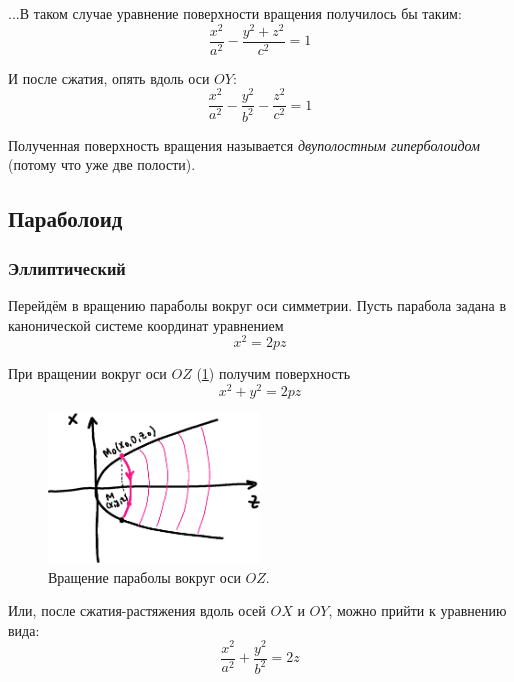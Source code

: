 \documentclass[a4paper,12pt]{article}
\begin{document}
  ...В таком случае уравнение поверхности вращения получилось бы таким:
  \[
    \frac{x^2}{a^2} - \frac{y^2 + z^2}{c^2} = 1
  \]
  
  И после сжатия, опять вдоль оси $OY$:
  \begin{equation}
    \label{eq:hyperboloid2}
    \boxed{
      \frac{x^2}{a^2} - \frac{y^2}{b^2} - \frac{z^2}{c^2} = 1
    }
  \end{equation}
  
  Полученная поверхность вращения называется \emph{двуполостным гиперболоидом} (потому что уже две полости).
  
  
  \subsection{Параболоид}
  
  \subsubsection{Эллиптический}
  
  Перейдём в вращению параболы вокруг оси симметрии.
  Пусть парабола задана в канонической системе координат уравнением
  \[
    x^2 = 2pz
  \]
  
  При вращении вокруг оси $OZ$ (\ref{fig:parabola-rotate-1}) получим поверхность
  \[
    x^2 + y^2 = 2pz
  \]
  
  \begin{figure}[h]
    \centering

    \includegraphics[width=0.5\textwidth]{parabola-rotate-1}
  
    \caption{Вращение параболы вокруг оси $OZ$.}
    \label{fig:parabola-rotate-1}
  \end{figure}
  
  Или, после сжатия-растяжения вдоль осей $OX$ и $OY$, можно прийти к уравнению вида:
  \begin{equation}
    \label{eq:paraboloid1}
    \boxed{
      \frac{x^2}{a^2} + \frac{y^2}{b^2} = 2z
    }
  \end{equation}
  
\end{document}
